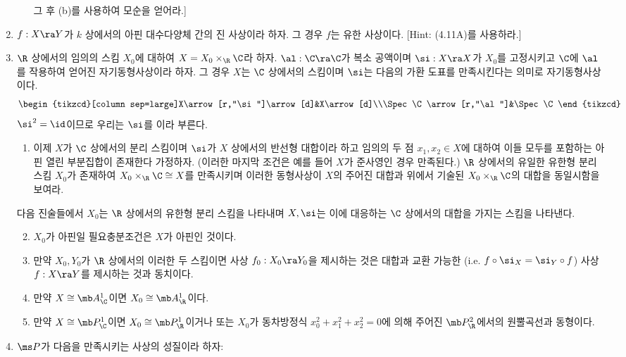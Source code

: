 \begin{enumerate}[label=\tb{4.\arabic*.},itemindent=0mm,itemsep=2mm]
\begin{enumerate}[label=(\alph*)]
	그 후 (b)를 사용하여 모순을 얻어라.]
	\end{enumerate}
	\item $f:X\ra Y$가 $k$ 상에서의 아핀 대수다양체 간의 진 사상이라 하자. 그 경우 $f$는 유한 사상이다.
	[Hint: (4.11A)를 사용하라.]
	\item {} $\R$ 상에서의 임의의 스킴 $X_0$에 대하여 $X=X_0\times_{\R}\C$라 하자.
	$\al:\C\ra\C$가 복소 공액이며 $\si:X\ra X$가 $X_0$를 고정시키고 $\C$에 $\al$를 작용하여 얻어진 자기동형사상이라 하자.
	그 경우 $X$는 $\C$ 상에서의 스킴이며 $\si$는 다음의 가환 도표를 만족시킨다는 의미로  자기동형사상이다.
	$$\begin{tikzcd}[column sep=large]X\arrow[r,"\si"]\arrow[d]&X\arrow[d]\\\Spec\C\arrow[r,"\al"]&\Spec\C\end{tikzcd}$$
	$\si^2=\id$이므로 우리는 $\si$를 이라 부른다.
	\begin{enumerate}[label=(\alph*)]
	\item 이제 $X$가 $\C$ 상에서의 분리 스킴이며 $\si$가 $X$ 상에서의 반선형 대합이라 하고
	임의의 두 점 $x_1,x_2\in X$에 대하여 이들 모두를 포함하는 아핀 열린 부분집합이 존재한다 가정하자.
	(이러한 마지막 조건은 예를 들어 $X$가 준사영인 경우 만족된다.)
	$\R$ 상에서의 유일한 유한형 분리 스킴 $X_0$가 존재하여 $X_0\times_{\R}\C\cong X$를 만족시키며
	이러한 동형사상이 $X$의 주어진 대합과 위에서 기술된 $X_0\times_{\R}\C$의 대합을 동일시함을 보여라.
	\end{enumerate}
	다음 진술들에서 $X_0$는 $\R$ 상에서의 유한형 분리 스킴을 나타내며
	$X,\si$는 이에 대응하는 $\C$ 상에서의 대합을 가지는 스킴을 나타낸다.
	\begin{enumerate}[label=(\alph*)]
	\setcounter{enumii}{1}
	\item $X_0$가 아핀일 필요충분조건은 $X$가 아핀인 것이다.
	\item 만약 $X_0,Y_0$가 $\R$ 상에서의 이러한 두 스킴이면 사상 $f_0:X_0\ra Y_0$을 제시하는 것은
	대합과 교환 가능한 (i.e. $f\circ\si_X=\si_Y\circ f$) 사상 $f:X\ra Y$를 제시하는 것과 동치이다.
	\item 만약 $X\cong\mb A^1_{\C}$이면 $X_0\cong\mb A^1_{\R}$이다.
	\item 만약 $X\cong\mb P^1_{\C}$이면 $X_0\cong\mb P^1_{\R}$이거나
	또는 $X_0$가 동차방정식 $x_0^2+x_1^2+x_2^2=0$에 의해 주어진 $\mb P^2_{\R}$에서의 원뿔곡선과 동형이다.
	\end{enumerate}
	\item $\ms P$가 다음을 만족시키는 사상의 성질이라 하자:

\end{enumerate}
